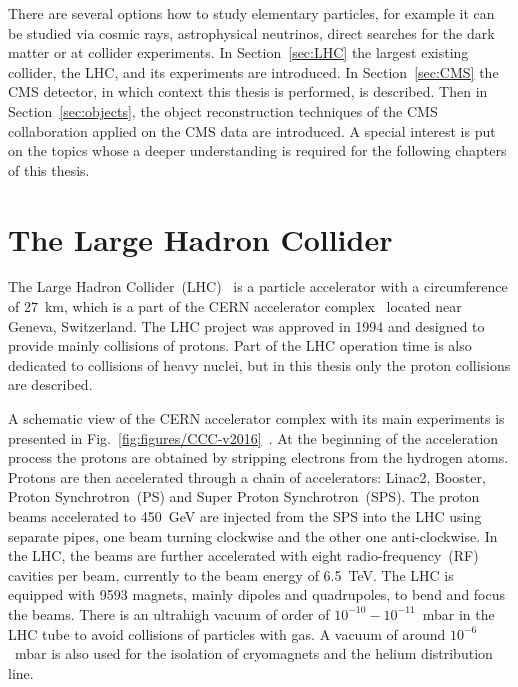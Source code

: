 \clearpage

\setcounter{secnumdepth}{4}
\setcounter{secnumdepth}{5}

There are several options how to study elementary particles, for example it can be studied via cosmic rays, astrophysical neutrinos, direct searches for the dark matter or at collider experiments. In Section~\ref{sec:LHC} the largest existing collider, the LHC, and its experiments are introduced. In Section~\ref{sec:CMS} the CMS detector, in which context this thesis is performed, is described. Then in Section~\ref{sec:objects}, the object reconstruction techniques of the CMS collaboration applied on the CMS data are introduced. A special interest is put on the topics whose a deeper understanding is required for the following chapters of this thesis.

\section{The Large Hadron Collider~\label{sec:LHC}}

The Large Hadron Collider~(LHC)~\cite{CERN-Brochure-2017-002-Eng, Evans:2008zzb} is a particle accelerator with a circumference of 27~km, which is a part of the CERN accelerator complex~\cite{Bruning:2004ej} located near Geneva, Switzerland. The LHC project was approved in 1994 and designed to provide mainly collisions of protons. Part of the LHC operation time is also dedicated to collisions of heavy nuclei, but in this thesis only the proton collisions are described.

A schematic view of the CERN accelerator complex with its main experiments is presented in Fig.~\ref{fig:figures/CCC-v2016}~\cite{Mobs:2225847}. At the beginning of the acceleration process the protons are obtained by stripping electrons from the hydrogen atoms. Protons are then accelerated through a chain of accelerators: Linac2, Booster, Proton Synchrotron~(PS) and Super Proton Synchrotron~(SPS). The proton beams accelerated to 450~GeV are injected from the SPS into the LHC using separate pipes, one beam turning clockwise and the other one anti-clockwise. In the LHC, the beams are further accelerated with eight radio-frequency~(RF) cavities per beam, currently to the beam energy of 6.5~TeV. The LHC is equipped with 9593 magnets, mainly dipoles and quadrupoles, to bend and focus the beams. There is an ultrahigh vacuum of order of $10^{-10}-10^{-11}$~mbar in the LHC tube to avoid collisions of particles with gas. A vacuum of around $10^{-6}$~mbar is also used for the isolation  of cryomagnets and the helium distribution line.

